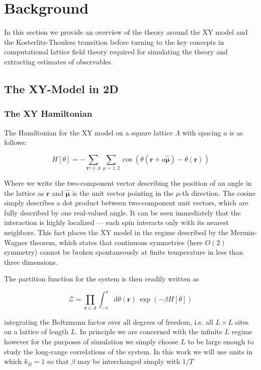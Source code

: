 \documentclass[12pt]{article}
\begin{document}
\section{Background}

In this section we provide an overview of the theory around the XY model and the Kosterlitz-Thouless transition before turning to the key concepts in computational
lattice field theory required for simulating the theory and extracting estimates of observables.

\subsection{The XY-Model in 2D}

\subsubsection{The XY Hamiltonian}

The Hamiltonian for the XY model on a square lattice $\Lambda$ with spacing $a$ is as follows:

\begin{equation}
	H[\theta] = -\sum_{\mathbf{r}r\in\Lambda}\sum_{\mu=1,2}\cos(\theta(\mathbf{r}+a\hat{\pmb{\mu}})-\theta(\mathbf{\mathbf{r}}))
\end{equation}

Where we write the two-component vector describing the position of an angle in the lattice as $\mathbf{r}$ and $\hat{\mathbf{\mu}}$ is the unit vector
pointing in the $\mu$-th direction. The cosine simply describes a dot product between two-component unit vectors, which are fully described by one
real-valued angle. It can be seen immediately that the interaction is highly localized --- each spin interacts only with its nearest neighbors. This fact places
the XY model in the regime described by the Mermin-Wagner theorem, which states that continuous symmetries (here $O(2)$ symmetry) cannot
be broken spontaneously at finite temperature in less than three dimensions.

The partition function for the system is then readily written as

\begin{equation} \label{eq:partition}
	\mathcal{Z} = \prod_{\mathbf{r}\in\Lambda}\int_{-\pi}^{\pi}\mathrm{d}\theta(\mathbf{r})\,\exp\left(-\beta H[\theta] \right)
\end{equation}

integrating the Boltzmann factor over all degrees of freedom, i.e. all $L\times L$ sites on a lattice of length $L$. In principle we are concerned with the infinite $L$ regime
however for the purposes of simulation we simply choose $L$ to be large enough to study the long-range correlations of the system. In this work we will use
units in which $k_B=1$ so that $\beta$ may be interchanged simply with $1/T$
\end{document}
